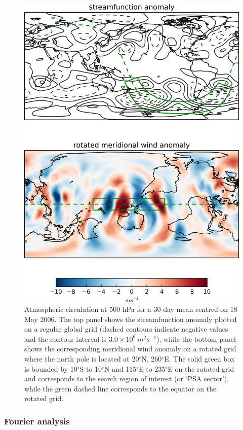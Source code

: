 \begin{figure}
\begin{center}
\includegraphics[width=0.7\columnwidth]{figures/psa/rotation_example_2006-05-18.png}
\caption{\label{fig:rotation}
Atmospheric circulation at 500 hPa for a 30-day mean centred on 18 May 2006. The top panel shows the streamfunction anomaly plotted on a regular global grid (dashed contours indicate negative values and the contour interval is $3.0 \times 10^6 \: m^2 s^{-1}$), while the bottom panel shows the corresponding meridional wind anomaly on a rotated grid where the north pole is located at 20$^{\circ}$N, 260$^{\circ}$E. The solid green box is bounded by 10$^{\circ}$S to 10$^{\circ}$N and 115$^{\circ}$E to 235$^{\circ}$E on the rotated grid and corresponds to the search region of interest (or `PSA sector'), while the green dashed line corresponds to the equator on the rotated grid.%
}
\end{center}
\end{figure}

\subsubsection{Fourier analysis}

